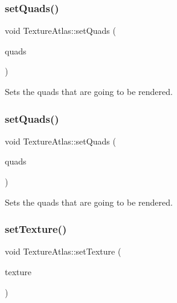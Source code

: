 \subsubsection{\texorpdfstring{set\+Quads()}{setQuads()}\hspace{0.1cm}{\footnotesize\ttfamily [1/2]}}
{\footnotesize\ttfamily void Texture\+Atlas\+::set\+Quads (\begin{DoxyParamCaption}\item[{\hyperlink{structV3F__C4B__T2F__Quad}{V3\+F\+\_\+\+C4\+B\+\_\+\+T2\+F\+\_\+\+Quad} $\ast$}]{quads }\end{DoxyParamCaption})}

Sets the quads that are going to be rendered. \mbox{\label{classTextureAtlas_a59e3e4fea0e05019cfc94bea32122467}} 
\subsubsection{\texorpdfstring{set\+Quads()}{setQuads()}\hspace{0.1cm}{\footnotesize\ttfamily [2/2]}}
{\footnotesize\ttfamily void Texture\+Atlas\+::set\+Quads (\begin{DoxyParamCaption}\item[{\hyperlink{structV3F__C4B__T2F__Quad}{V3\+F\+\_\+\+C4\+B\+\_\+\+T2\+F\+\_\+\+Quad} $\ast$}]{quads }\end{DoxyParamCaption})}

Sets the quads that are going to be rendered. \mbox{\label{classTextureAtlas_ab55928f2095021b5f733e92e05496457}} 
\subsubsection{\texorpdfstring{set\+Texture()}{setTexture()}\hspace{0.1cm}{\footnotesize\ttfamily [1/2]}}
{\footnotesize\ttfamily void Texture\+Atlas\+::set\+Texture (\begin{DoxyParamCaption}\item[{\hyperlink{classTexture2D}{Texture2D} $\ast$}]{texture }\end{DoxyParamCaption})}

